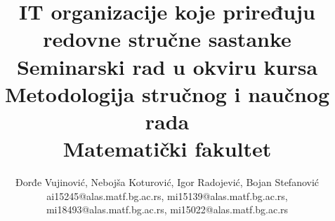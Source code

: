 \documentclass[a4paper]{article}
\begin{document}

\title{IT organizacije koje priređuju redovne stručne sastanke\\ \small{Seminarski rad u okviru kursa\\Metodologija stručnog i naučnog rada\\ Matematički fakultet}}

\author{Đorđe Vujinović, Nebojša Koturović, Igor Radojević, Bojan Stefanović\\ ai15245@alas.matf.bg.ac.rs, mi15139@alas.matf.bg.ac.rs, \\ mi18493@alas.matf.bg.ac.rs, mi15022@alas.matf.bg.ac.rs}


\maketitle
\end{document}
